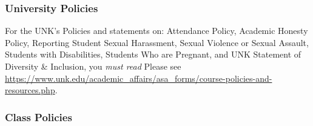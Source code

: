 \documentclass[12pt]{article}
\newcounter{ex}\setcounter{ex}{0}
\begin{document}
\subsubsection*{University Policies}

For the UNK's Policies and statements on: Attendance Policy, Academic Honesty Policy, Reporting Student Sexual Harassment, Sexual Violence or Sexual Assault, Students with Disabilities, Students Who are Pregnant, and UNK Statement of Diversity \& Inclusion,  you \emph{must read}
Please see \url{https://www.unk.edu/academic_affairs/asa_forms/course-policies-and-resources.php}.

\subsubsection* {Class Policies}


 
\end{document}
